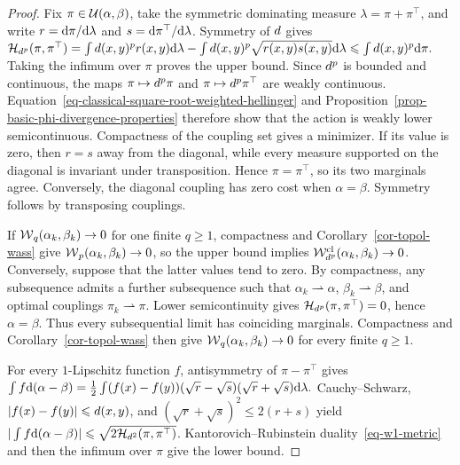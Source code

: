 \begin{proof}
Fix $\pi\in\mathcal{U}(\alpha,\beta)$, take the symmetric dominating measure $\lambda=\pi+\pi^\top$, and write $r=\mathrm{d}\pi/\mathrm{d}\lambda$ and $s=\mathrm{d}\pi^\top/\mathrm{d}\lambda$. Symmetry of $d$ gives
\(\mathcal H_{d^p}(\pi,\pi^\top) = \int d(x,y)^p r(x,y)\mathrm{d}\lambda - \int d(x,y)^p\sqrt{r(x,y)s(x,y)}\mathrm{d}\lambda \leqslant \int d(x,y)^p\mathrm{d}\pi.\)
Taking the infimum over $\pi$ proves the upper bound. Since $d^p$ is bounded and continuous, the maps $\pi\mapsto d^p\pi$ and $\pi\mapsto d^p\pi^\top$ are weakly continuous. Equation~\eqref{eq-classical-square-root-weighted-hellinger} and Proposition~\ref{prop-basic-phi-divergence-properties} therefore show that the action is weakly lower semicontinuous. Compactness of the coupling set gives a minimizer. If its value is zero, then $r=s$ away from the diagonal, while every measure supported on the diagonal is invariant under transposition. Hence $\pi=\pi^\top$, so its two marginals agree. Conversely, the diagonal coupling has zero cost when $\alpha=\beta$. Symmetry follows by transposing couplings.

If $\operatorname{\mathcal{W}}_q(\alpha_k,\beta_k)\to0$ for one finite $q\geq1$, compactness and Corollary~\ref{cor-topol-wass} give $\operatorname{\mathcal{W}}_p(\alpha_k,\beta_k)\to0$, so the upper bound implies $\mathcal W_{d^p}^{\mathrm{cl}}(\alpha_k,\beta_k)\to0$. Conversely, suppose that the latter values tend to zero. By compactness, any subsequence admits a further subsequence such that $\alpha_k\rightharpoonup\alpha$, $\beta_k\rightharpoonup\beta$, and optimal couplings $\pi_k\rightharpoonup\pi$. Lower semicontinuity gives $\mathcal H_{d^p}(\pi,\pi^\top)=0$, hence $\alpha=\beta$. Thus every subsequential limit has coinciding marginals. Compactness and Corollary~\ref{cor-topol-wass} then give $\operatorname{\mathcal{W}}_q(\alpha_k,\beta_k)\to0$ for every finite $q\geq1$.

For every $1$-Lipschitz function $f$, antisymmetry of $\pi-\pi^\top$ gives \(\int f\mathrm{d}(\alpha-\beta) = \frac12\int(f(x)-f(y))(\sqrt r-\sqrt s)(\sqrt r+\sqrt s)\mathrm{d}\lambda.\)
Cauchy--Schwarz, $|f(x)-f(y)|\leqslant d(x,y)$, and $(\sqrt r+\sqrt s)^2\leq2(r+s)$ yield
$|\int f\mathrm{d}(\alpha-\beta)|\leqslant\sqrt{2\mathcal H_{d^2}(\pi,\pi^\top)}$. Kantorovich--Rubinstein duality~\eqref{eq-w1-metric} and then the infimum over $\pi$ give the lower bound.
\end{proof}
